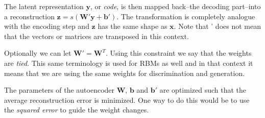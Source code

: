 \documentclass[11pt]{article}
\begin{document}
The latent representation $\mathbf{y}$, or \textit{code}, is then mapped back--the decoding part--into a reconstruction $\mathbf{z} = s(\mathbf{W'}\mathbf{y} + \mathbf{b'})$.  The transformation is completely analogue with the encoding step and $\mathbf{z}$ has the same shape as $\mathbf{x}$.  Note that ' does not mean that the vectors or matrices are transposed in this context.

Optionally we can let $\mathbf{W'} = \mathbf{W}^T$.  Using this constraint we say that the weights are \textit{tied}.  This same terminology is used for RBMs as well and in that context it means that we are using the same weights for discrimination and generation.

The parameters of the autoencoder $\mathbf{W}$, $\mathbf{b}$ and $\mathbf{b'}$ are optimized such that the average reconstruction error is minimized.  One way to do this would be to use the \textit{squared error} to guide the weight changes.
\end{document}

